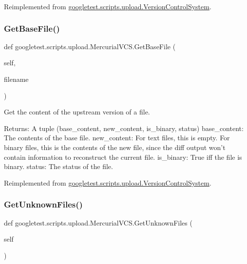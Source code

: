 Reimplemented from \mbox{\hyperlink{classgoogletest_1_1scripts_1_1upload_1_1_version_control_system_aaada7d567809eca22e4a9ddd377429fe}{googletest.\+scripts.\+upload.\+Version\+Control\+System}}.

\mbox{\label{classgoogletest_1_1scripts_1_1upload_1_1_mercurial_v_c_s_ab76cf6be7060406969e511b335874fb9}} 
\subsubsection{\texorpdfstring{GetBaseFile()}{GetBaseFile()}}
{\footnotesize\ttfamily def googletest.\+scripts.\+upload.\+Mercurial\+V\+C\+S.\+Get\+Base\+File (\begin{DoxyParamCaption}\item[{}]{self,  }\item[{}]{filename }\end{DoxyParamCaption})}

\begin{DoxyVerb}Get the content of the upstream version of a file.

Returns:
  A tuple (base_content, new_content, is_binary, status)
base_content: The contents of the base file.
new_content: For text files, this is empty.  For binary files, this is
  the contents of the new file, since the diff output won't contain
  information to reconstruct the current file.
is_binary: True iff the file is binary.
status: The status of the file.
\end{DoxyVerb}
 

Reimplemented from \mbox{\hyperlink{classgoogletest_1_1scripts_1_1upload_1_1_version_control_system_af04094a3d55158ec8731c57af99eaf4c}{googletest.\+scripts.\+upload.\+Version\+Control\+System}}.

\mbox{\label{classgoogletest_1_1scripts_1_1upload_1_1_mercurial_v_c_s_ae616fb90f66bc9060d4e0637dc5ac9a6}} 
\subsubsection{\texorpdfstring{GetUnknownFiles()}{GetUnknownFiles()}}
{\footnotesize\ttfamily def googletest.\+scripts.\+upload.\+Mercurial\+V\+C\+S.\+Get\+Unknown\+Files (\begin{DoxyParamCaption}\item[{}]{self }\end{DoxyParamCaption})}

